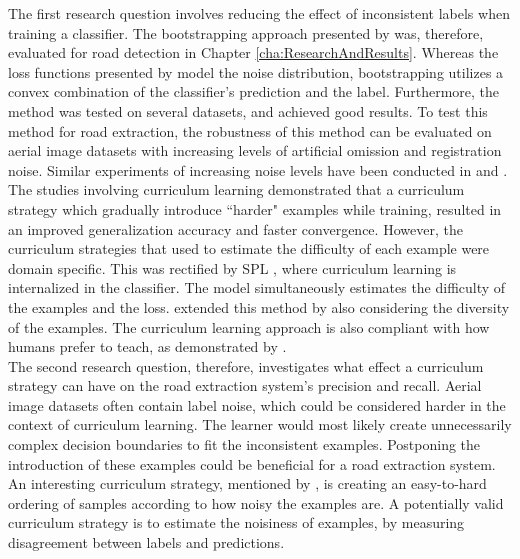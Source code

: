 The first research question involves reducing the effect of inconsistent labels when training a classifier. The bootstrapping approach presented by \cite{Reed_noisy_labels_bootstrapping} was, therefore, evaluated for road detection in Chapter \ref{cha:ResearchAndResults}. Whereas the loss functions presented by \cite{Mnih_aerial_images_noisy} model the noise distribution,  bootstrapping utilizes a convex combination of the classifier's prediction and the label. Furthermore, the method was tested on several datasets, and achieved good results. To test this method for road extraction, the robustness of this method can be evaluated on aerial image datasets with increasing levels of artificial omission and registration noise. Similar experiments of increasing noise levels have been conducted in \citep{Sukhbaatar_noisy_network_learning} and \citep{Reed_noisy_labels_bootstrapping}.\\

The studies involving curriculum learning demonstrated that a curriculum strategy which gradually introduce ``harder" examples while training, resulted in an improved generalization accuracy and faster convergence. However, the curriculum strategies that \cite{Bengio_curriculumlearning} used to estimate the difficulty of each example were domain specific. This was rectified by \ac{SPL} \citep{Kumar_self_paced_learning}, where curriculum learning is internalized in the classifier. The model simultaneously estimates the difficulty of the examples and the loss. \cite{Lu_self-paced_learning_diversity} extended this method by also considering the diversity of the examples. The curriculum learning approach is also compliant with how humans prefer to teach, as demonstrated by \cite{Khan_human_teach}.\\

The second research question, therefore, investigates what effect a curriculum strategy can have on the road extraction system's precision and recall. Aerial image datasets often contain label noise, which could be considered harder in the context of curriculum learning. The learner would most likely create unnecessarily complex decision boundaries to fit the inconsistent examples. Postponing the introduction of these examples could be beneficial for a road extraction system. An interesting curriculum strategy, mentioned by \cite{Bengio_curriculumlearning}, is creating an easy-to-hard ordering of samples according to how noisy the examples are. A potentially valid curriculum strategy is to estimate the noisiness of examples, by measuring disagreement between labels and predictions.\\